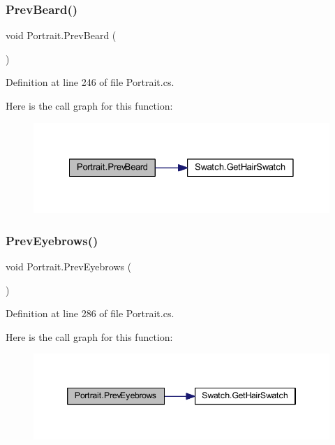 \subsubsection{\texorpdfstring{PrevBeard()}{PrevBeard()}}
{\footnotesize\ttfamily void Portrait.\+Prev\+Beard (\begin{DoxyParamCaption}{ }\end{DoxyParamCaption})}



Definition at line 246 of file Portrait.\+cs.

Here is the call graph for this function\+:
\nopagebreak
\begin{figure}[H]
\begin{center}
\leavevmode
\includegraphics[width=328pt]{class_portrait_ada91686eb3d44e5771a81dc147462258_cgraph}
\end{center}
\end{figure}
\mbox{\label{class_portrait_abce38ec7263bad9ae029b40e585fe6b1}} 
\subsubsection{\texorpdfstring{PrevEyebrows()}{PrevEyebrows()}}
{\footnotesize\ttfamily void Portrait.\+Prev\+Eyebrows (\begin{DoxyParamCaption}{ }\end{DoxyParamCaption})}



Definition at line 286 of file Portrait.\+cs.

Here is the call graph for this function\+:
\nopagebreak
\begin{figure}[H]
\begin{center}
\leavevmode
\includegraphics[width=346pt]{class_portrait_abce38ec7263bad9ae029b40e585fe6b1_cgraph}
\end{center}
\end{figure}
\mbox{\label{class_portrait_aa550ccd7202589090d88e812743da74a}} 
